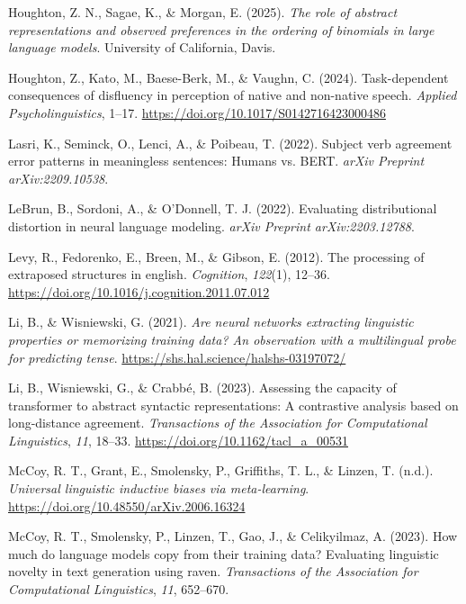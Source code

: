 \documentclass[
  10pt,
  nohyperref]{acl}
\newlength{\cslhangindent}
\newenvironment{CSLReferences}[2] %
 {\begin{list}{}{%
  \setlength{\itemindent}{0pt}
  \setlength{\leftmargin}{0pt}
  \setlength{\parsep}{0pt}
  \ifodd #1
   \setlength{\leftmargin}{\cslhangindent}
   \setlength{\itemindent}{-1\cslhangindent}
  \fi
  \setlength{\itemsep}{#2\baselineskip}}}
 {\end{list}}
\begin{document}
\begin{CSLReferences}{1}{0}
Houghton, Z. N., Sagae, K., \& Morgan, E. (2025). \emph{The role of
abstract representations and observed preferences in the ordering of
binomials in large language models}. University of California, Davis.

Houghton, Z., Kato, M., Baese-Berk, M., \& Vaughn, C. (2024).
Task-dependent consequences of disfluency in perception of native and
non-native speech. \emph{Applied Psycholinguistics}, 1--17.
\url{https://doi.org/10.1017/S0142716423000486}

Lasri, K., Seminck, O., Lenci, A., \& Poibeau, T. (2022). Subject verb
agreement error patterns in meaningless sentences: Humans vs. BERT.
\emph{arXiv Preprint arXiv:2209.10538}.

LeBrun, B., Sordoni, A., \& O'Donnell, T. J. (2022). Evaluating
distributional distortion in neural language modeling. \emph{arXiv
Preprint arXiv:2203.12788}.

Levy, R., Fedorenko, E., Breen, M., \& Gibson, E. (2012). The processing
of extraposed structures in english. \emph{Cognition}, \emph{122}(1),
12--36. \url{https://doi.org/10.1016/j.cognition.2011.07.012}

Li, B., \& Wisniewski, G. (2021). \emph{Are neural networks extracting
linguistic properties or memorizing training data? An observation with a
multilingual probe for predicting tense}.
\url{https://shs.hal.science/halshs-03197072/}

Li, B., Wisniewski, G., \& Crabbé, B. (2023). Assessing the capacity of
transformer to abstract syntactic representations: A contrastive
analysis based on long-distance agreement. \emph{Transactions of the
Association for Computational Linguistics}, \emph{11}, 18--33.
\url{https://doi.org/10.1162/tacl_a_00531}

McCoy, R. T., Grant, E., Smolensky, P., Griffiths, T. L., \& Linzen, T.
(n.d.). \emph{Universal linguistic inductive biases via meta-learning}.
\url{https://doi.org/10.48550/arXiv.2006.16324}

McCoy, R. T., Smolensky, P., Linzen, T., Gao, J., \& Celikyilmaz, A.
(2023). How much do language models copy from their training data?
Evaluating linguistic novelty in text generation using raven.
\emph{Transactions of the Association for Computational Linguistics},
\emph{11}, 652--670.


\end{CSLReferences}
\end{document}
